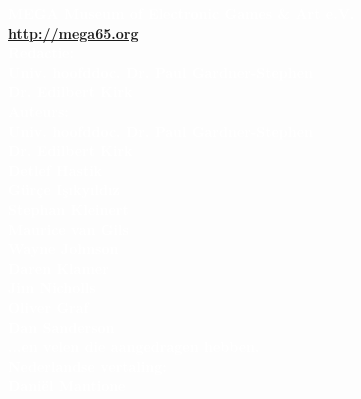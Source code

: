 
\begin{center}

\textbf{\large\textcolor{white}{MEGA Museum of Electronic Games \& Art e.V. \\
\vspace{3mm}
\url{http://mega65.org}}}\\
\vspace{6mm}
\textbf{\large\textcolor{white}{
Redactie:\\
\vspace{2mm}
Univ. hoofddoc. Dr. Paul Gardner-Stephen\\
Dr. Edilbert Kirk\\
\vspace{6mm}
Auteurs: \\
\vspace{2mm}
Univ. hoofddoc. Dr. Paul Gardner-Stephen\\
Dr. Edilbert Kirk\\
Detlef Hastik\\
Gürçe Işıkyıldız\\
Stephan Kleinert\\
Maurice van Gils\\
Wayne Johnson\\
Daren Klamer\\
Jim Nicholls\\
Oliver Graf\\
Dan Sanderson\\
\vspace{6mm}
...en velen die aangedragen hebben.\\
\vspace{6mm}
Nederlandse vertaling: \\
\vspace{2mm}
Daniël Mantione \\
}}
\vspace{2.5cm}
\colorbox{white}{\EANisbn[ISBN=000-0-0000000-0-0,SC4]}
\end{center}



